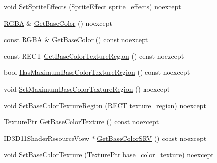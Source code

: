 \begin{DoxyCompactItemize}
\item 
void \hyperlink{classmage_1_1rendering_1_1_sprite_image_a504ebb2cdc216d26bdbcb24cfa5466d4}{Set\+Sprite\+Effects} (\hyperlink{namespacemage_1_1rendering_a4dbc3536c87b906f1d41d863ec458e78}{Sprite\+Effect} sprite\+\_\+effects) noexcept
\item 
\hyperlink{structmage_1_1_r_g_b_a}{R\+G\+BA} \& \hyperlink{classmage_1_1rendering_1_1_sprite_image_ab1ef6e7677aa9e98fa55b6d64befdd63}{Get\+Base\+Color} () noexcept
\item 
const \hyperlink{structmage_1_1_r_g_b_a}{R\+G\+BA} \& \hyperlink{classmage_1_1rendering_1_1_sprite_image_a8d86a293c822486ab1cf37a31c2b0b74}{Get\+Base\+Color} () const noexcept
\item 
const R\+E\+CT \hyperlink{classmage_1_1rendering_1_1_sprite_image_ae8d120b87e4791cf85799623ae554f41}{Get\+Base\+Color\+Texture\+Region} () const noexcept
\item 
bool \hyperlink{classmage_1_1rendering_1_1_sprite_image_a89e9dd78d50c2c312e06686bcc7347c1}{Has\+Maximum\+Base\+Color\+Texture\+Region} () const noexcept
\item 
void \hyperlink{classmage_1_1rendering_1_1_sprite_image_a5b0a8abc53768cce82c3c2f8f1a96745}{Set\+Maximum\+Base\+Color\+Texture\+Region} () noexcept
\item 
void \hyperlink{classmage_1_1rendering_1_1_sprite_image_a54b349a9f73c7d6f3ded4a3d1f3172bf}{Set\+Base\+Color\+Texture\+Region} (R\+E\+CT texture\+\_\+region) noexcept
\item 
\hyperlink{namespacemage_1_1rendering_a6f3ae54f825328465b0cdde0f0de4a36}{Texture\+Ptr} \hyperlink{classmage_1_1rendering_1_1_sprite_image_ab5b257c4df82dc72223affe8b32c0b70}{Get\+Base\+Color\+Texture} () const noexcept
\item 
I\+D3\+D11\+Shader\+Resource\+View $\ast$ \hyperlink{classmage_1_1rendering_1_1_sprite_image_a7dceee8dfe1432948a77f0563d6b70a3}{Get\+Base\+Color\+S\+RV} () const noexcept
\item 
void \hyperlink{classmage_1_1rendering_1_1_sprite_image_a363b30407434dea9d3069142ff8c4059}{Set\+Base\+Color\+Texture} (\hyperlink{namespacemage_1_1rendering_a6f3ae54f825328465b0cdde0f0de4a36}{Texture\+Ptr} base\+\_\+color\+\_\+texture) noexcept
\end{DoxyCompactItemize}
